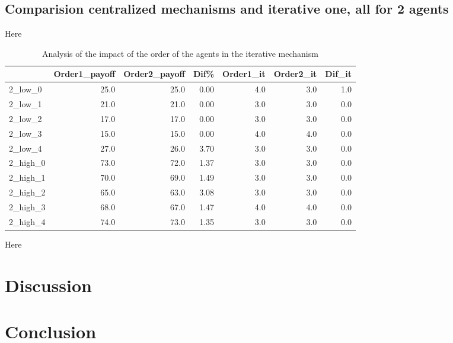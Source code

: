 \documentclass[review]{elsarticle}
\begin{document}
\subsection{Comparision centralized mechanisms and iterative one, all for 2 agents}

Here

\begin{table}[ht!]
\caption{Analysis of the impact of the order of the agents in the iterative mechanism \label{tb:iter_order_comparition}}
\begin{tabular}{lrrrrrr}
\toprule
{} &  Order1\_payoff &  Order2\_payoff &      Dif\% &  Order1\_it &  Order2\_it &  Dif\_it \\
\midrule
2\_low\_0  &           25.0 &           25.0 &  0.00 &        4.0 &        3.0 &     1.0 \\
2\_low\_1  &           21.0 &           21.0 &  0.00 &        3.0 &        3.0 &     0.0 \\
2\_low\_2  &           17.0 &           17.0 &  0.00 &        3.0 &        3.0 &     0.0 \\
2\_low\_3  &           15.0 &           15.0 &  0.00 &        4.0 &        4.0 &     0.0 \\
2\_low\_4  &           27.0 &           26.0 &  3.70 &        3.0 &        3.0 &     0.0 \\
2\_high\_0 &           73.0 &           72.0 &  1.37 &        3.0 &        3.0 &     0.0 \\
2\_high\_1 &           70.0 &           69.0 &  1.49 &        3.0 &        3.0 &     0.0 \\
2\_high\_2 &           65.0 &           63.0 &  3.08 &        3.0 &        3.0 &     0.0 \\
2\_high\_3 &           68.0 &           67.0 &  1.47 &        4.0 &        4.0 &     0.0 \\
2\_high\_4 &           74.0 &           73.0 &  1.35 &        3.0 &        3.0 &     0.0 \\
\bottomrule
\end{tabular}
\end{table}

Here
\section{Discussion} \label{seq:discussion}

\section{Conclusion} \label{seq:conclusion}
\end{document}
